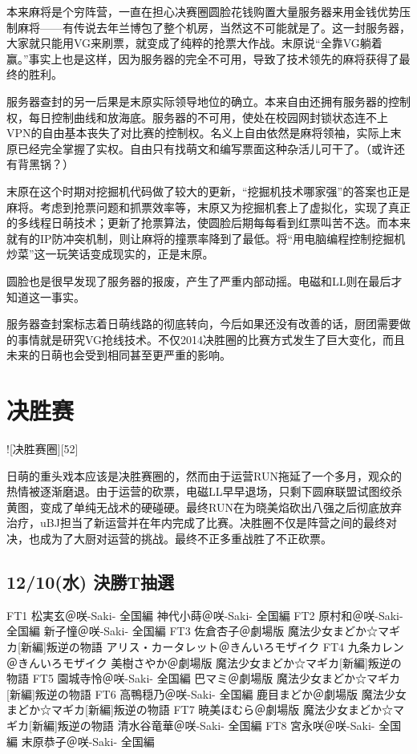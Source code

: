 本来麻将是个穷阵营，一直在担心决赛圈圆脸花钱购置大量服务器来用金钱优势压制麻将——有传说去年兰博包了整个机房，当然这不可能就是了。这一封服务器，大家就只能用VG来刷票，就变成了纯粹的抢票大作战。末原说“全靠VG躺着赢。”事实上也是这样，因为服务器的完全不可用，导致了技术领先的麻将获得了最终的胜利。

服务器查封的另一后果是末原实际领导地位的确立。本来自由还拥有服务器的控制权，每日控制曲线和放海底。服务器的不可用，使处在校园网封锁状态连不上VPN的自由基本丧失了对比赛的控制权。名义上自由依然是麻将领袖，实际上末原已经完全掌握了实权。自由只有找萌文和编写票面这种杂活儿可干了。（或许还有背黑锅？）

末原在这个时期对挖掘机代码做了较大的更新，“挖掘机技术哪家强”的答案也正是麻将。考虑到抢票问题和抓票效率等，末原又为挖掘机套上了虚拟化，实现了真正的多线程日萌技术；更新了抢票算法，使圆脸后期每每看到红票叫苦不迭。而本来就有的IP防冲突机制，则让麻将的撞票率降到了最低。将“用电脑编程控制挖掘机炒菜”这一玩笑话变成现实的，正是末原。

圆脸也是很早发现了服务器的报废，产生了严重内部动摇。电磁和LL则在最后才知道这一事实。

服务器查封案标志着日萌线路的彻底转向，今后如果还没有改善的话，厨团需要做的事情就是研究VG抢线技术。不仅2014决胜圈的比赛方式发生了巨大变化，而且未来的日萌也会受到相同甚至更严重的影响。

\section{决胜赛}

![决胜赛圈][52]

日萌的重头戏本应该是决胜赛圈的，然而由于运营RUN拖延了一个多月，观众的热情被逐渐磨退。由于运营的砍票，电磁LL早早退场，只剩下圆麻联盟试图绞杀黄图，变成了单纯无战术的硬碰硬。最终RUN在为晓美焰砍出八强之后彻底放弃治疗，uBJ担当了新运营并在年内完成了比赛。决胜圈不仅是阵营之间的最终对决，也成为了大厨对运营的挑战。最终不正多重战胜了不正砍票。

\subsection{12/10(水) 決勝T抽選}

	FT1 松実玄＠咲-Saki- 全国編 神代小蒔＠咲-Saki- 全国編
	FT2 原村和＠咲-Saki- 全国編  新子憧＠咲-Saki- 全国編
	FT3 佐倉杏子＠劇場版 魔法少女まどか☆マギカ[新編]叛逆の物語  アリス・カータレット＠きんいろモザイク
	FT4 九条カレン＠きんいろモザイク  美樹さやか＠劇場版 魔法少女まどか☆マギカ[新編]叛逆の物語
	FT5 園城寺怜＠咲-Saki- 全国編  巴マミ＠劇場版 魔法少女まどか☆マギカ[新編]叛逆の物語
	FT6 高鴨穏乃＠咲-Saki- 全国編  鹿目まどか＠劇場版 魔法少女まどか☆マギカ[新編]叛逆の物語
	FT7 暁美ほむら＠劇場版 魔法少女まどか☆マギカ[新編]叛逆の物語  清水谷竜華＠咲-Saki- 全国編
	FT8 宮永咲＠咲-Saki- 全国編  末原恭子＠咲-Saki- 全国編


